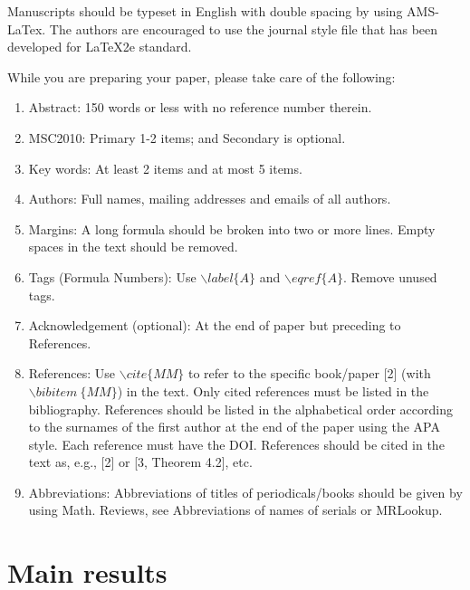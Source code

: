 \documentclass[12pt, reqno]{amsart}
\theoremstyle{definition}
\theoremstyle{remark}
\numberwithin{equation}{section}
\begin{document}
Manuscripts should be typeset in English with double spacing by
using AMS-LaTex. The authors are encouraged to use the journal style
file that has been developed for LaTeX2e standard.

While you are preparing your paper, please take care of the
following:
\begin{enumerate}
\item Abstract: 150 words or less with no reference number therein.\\
\item MSC2010: Primary 1-2 items; and Secondary is optional.\\

\item Key words: At least 2 items and at most 5 items.\\
\item Authors: Full names, mailing addresses and emails of all authors.\\
\item Margins: A long formula should be broken into two or more lines. Empty spaces in the text should be removed.\\
\item Tags (Formula Numbers): Use $\backslash label\{A\}$ and $\backslash eqref\{A\}$. Remove unused tags. \\
\item Acknowledgement (optional): At the end of paper but preceding to References.\\
\item References: Use $\backslash cite\{MM\}$ to refer to the specific book/paper [2] (with $\backslash bibitem~\{MM\}$) in the text. Only cited references must be listed in the bibliography. References should be listed in the alphabetical order according to the surnames of the first author at the end of the paper using the APA style. Each reference must have the DOI.
References should be cited in the text as, e.g., [2] or [3, Theorem 4.2], etc.  \\
\item Abbreviations: Abbreviations of titles of periodicals/books should be given by using Math. Reviews, see Abbreviations of names of serials or MRLookup.

\end{enumerate}

\section{Main results}
\end{document}
